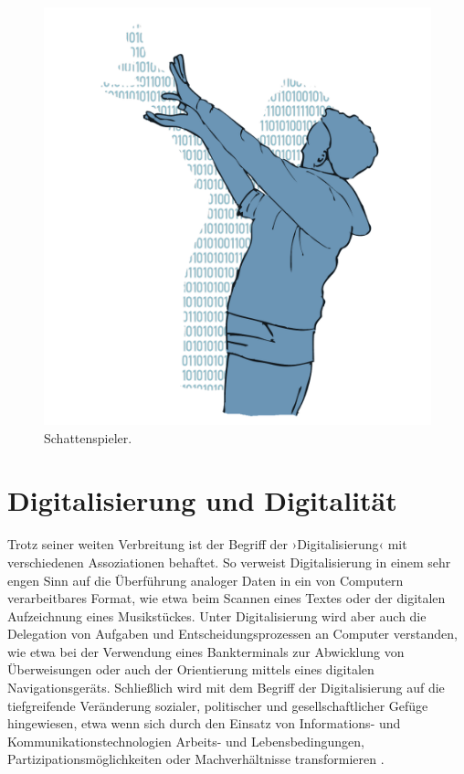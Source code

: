 \documentclass[
  a4paper,
]{book}
\begin{document}
\begin{figure}

{\centering \includegraphics{Figures/01-1-Schattenspieler} 

}

\caption{Schattenspieler.}\label{fig:fig1}
\end{figure}

\section{Digitalisierung und Digitalität}\label{digitalisierung-und-digitalituxe4t}

Trotz seiner weiten Verbreitung ist der Begriff der ›Digitalisierung‹ mit verschiedenen Assoziationen behaftet. So verweist Digitalisierung in einem sehr engen Sinn auf die Überführung analoger Daten in ein von Computern verarbeitbares Format, wie etwa beim Scannen eines Textes oder der digitalen Aufzeichnung eines Musikstückes. Unter Digitalisierung wird aber auch die Delegation von Aufgaben und Entscheidungsprozessen an Computer verstanden, wie etwa bei der Verwendung eines Bankterminals zur Abwicklung von Überweisungen oder auch der Orientierung mittels eines digitalen Navigationsgeräts. Schließlich wird mit dem Begriff der Digitalisierung auf die tiefgreifende Veränderung sozialer, politischer und gesellschaftlicher Gefüge hingewiesen, etwa wenn sich durch den Einsatz von Informations- und Kommunikationstechnologien Arbeits- und Lebensbedingungen, Partizipationsmöglichkeiten oder Machverhältnisse transformieren \citep{brindaFrankfurtDreieckZurBildung2019}.
\end{document}
